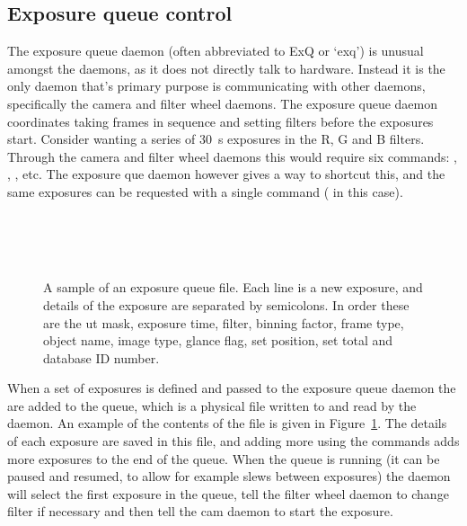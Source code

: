 \begin{colsection}
\begin{colsection}
\end{colsection}


\subsection{Exposure queue control}
\label{sec:exq}
\begin{colsection}

The exposure queue daemon (often abbreviated to ExQ or `exq') is unusual amongst the daemons, as it does not directly talk to hardware. Instead it is the only daemon that's primary purpose is communicating with other daemons, specifically the camera and filter wheel daemons. The exposure queue daemon coordinates taking frames in sequence and setting filters before the exposures start. Consider wanting a series of \SI{30}{\second} exposures in the R, G and B filters. Through the camera and filter wheel daemons this would require six commands: , , ,  etc. The exposure que daemon however gives a way to shortcut this, and the same exposures can be requested with a single command ( in this case).

\begin{figure}[t]
\begin{center}
\vspace{1cm}
\\
\\
\\
\vspace{0cm}
\end{center}
\caption[A sample exposure queue file]{A sample of an exposure queue file. Each line is a new exposure, and details of the exposure are separated by semicolons. In order these are the \gls{ut} mask, exposure time, filter, binning factor, frame type, object name, image type, glance flag, set position, set total and database ID number.}
\label{fig:exq_file}
\end{figure}

When a set of exposures is defined and passed to the exposure queue daemon the are added to the queue, which is a physical file written to and read by the daemon. An example of the contents of the file is given in Figure~\ref{fig:exq_file}. The details of each exposure are saved in this file, and adding more using the  commands adds more exposures to the end of the queue. When the queue is running (it can be paused and resumed, to allow for example slews between exposures) the daemon will select the first exposure in the queue, tell the filter wheel daemon to change filter if necessary and then tell the cam daemon to start the exposure.


\end{colsection}
\end{colsection}
